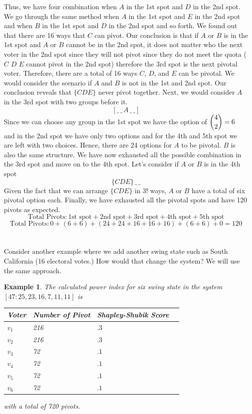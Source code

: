 \documentclass[12pt]{article}
\newtheorem{example}[theorem]{Example}
\begin{document}
Thus, we have four combination when $A$ in the 1st spot and $D$ in the 2nd spot. We go through the same method when $A$ in the 1st spot and $E$ in the 2nd spot and when $B$ in the 1st spot and $D$ in the 2nd spot and so forth. We found out that there are 16 ways that $C$ can pivot. Our conclusion is that if $A$ or $B$ is in the 1st spot and $A$ or $B$ cannot be in the 2nd spot, it does not matter who the next voter in the 2nd spot since they will not pivot since they do not meet the quota ($C$ $D$ $E$ cannot pivot in the 2nd spot) therefore the 3rd spot is the next pivotal voter. Therefore, there are a total of 16 ways $C$, $D$, and $E$ can be pivotal. We would consider the scenario if $A$ and $B$ is not in the 1st and 2nd spot. Our conclusion reveals that $\{CDE\}$ never pivot together. Next, we would consider $A$ in the 3rd spot with two groups before it. $$[\_\,\_\,A\,\_\,\_]$$ Since we can choose any group in the 1st spot we have the option of $\dbinom{4}{2}=6$ and in the 2nd spot we have only two options and for the 4th and 5th spot we are left with two choices. Hence, there are 24 options for $A$ to be pivotal. $B$ is also the same structure. We have now exhausted all the possible combination in the 3rd spot and move on to the 4th spot. Let's consider if $A$ or $B$ is in the 4th spot $$\{CDE\}\,\_\,\_$$ Given the fact that we can arrange  $\{CDE\}$ in 3! ways, $A$ or $B$ have a total of six pivotal option each. Finally, we have exhausted all the pivotal spots and have 120 pivots as expected.
$$\text{Total Pivots}: \text{1st spot}+\text{2nd spot}+\text{3rd spot}+\text{4th spot}+\text{5th spot}$$
$$\text{Total Pivots}:0+(6+6)+(24+24+16+16+16)+(6+6)+0 =120$$
\\
\\
\noindent Consider another example where we add another swing state such as South California (16 electoral votes.) How would that change the system? We will use the same approach. 



\begin{example}\label{SSP(CA6)}
The calculated power index for six swing state in the system $[47:25,23,16,7,11,11]$ is
\begin{center}
\begin{tabular}{ | l | l | l | p{5cm} |}
    \hline
    Voter & Number of Pivot & Shapley-Shubik Score \\ \hline
    ${v_1}$ & 216 & $.3$  \\ \hline
    ${v_2}$ & 216 & $.3$ \\ \hline
    ${v_3}$ & 72 & $.1$  \\ \hline
    $v_4$   & 72 & $.1$ \\ \hline
    $v_5$   & 72 & $.1$ \\ \hline
    $v_6$   & 72 & $.1$ \\ \hline
    \end{tabular}
\end{center}
with a total of 720 pivots.
\end{example}
\end{document}
